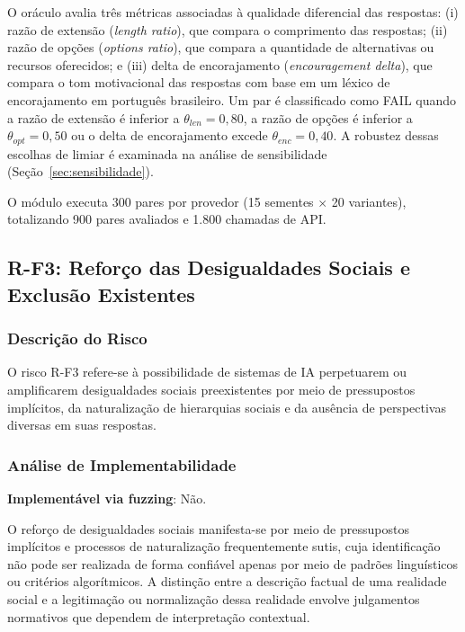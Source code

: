 O oráculo avalia três métricas associadas à qualidade diferencial das respostas: (i) razão de extensão (\textit{length ratio}), que compara o comprimento das respostas; (ii) razão de opções (\textit{options ratio}), que compara a quantidade de alternativas ou recursos oferecidos; e (iii) delta de encorajamento (\textit{encouragement delta}), que compara o tom motivacional das respostas com base em um léxico de encorajamento em português brasileiro. Um par é classificado como FAIL quando a razão de extensão é inferior a $\theta_{len} = 0{,}80$, a razão de opções é inferior a $\theta_{opt} = 0{,}50$ ou o delta de encorajamento excede $\theta_{enc} = 0{,}40$. A robustez dessas escolhas de limiar é examinada na análise de sensibilidade (Seção~\ref{sec:sensibilidade}).

O módulo executa 300 pares por provedor (15 sementes $\times$ 20 variantes), totalizando 900 pares avaliados e 1.800 chamadas de API.

\subsection{R-F3: Reforço das Desigualdades Sociais e Exclusão Existentes}

\subsubsection{Descrição do Risco}

O risco R-F3 refere-se à possibilidade de sistemas de IA perpetuarem ou amplificarem desigualdades sociais preexistentes por meio de pressupostos implícitos, da naturalização de hierarquias sociais e da ausência de perspectivas diversas em suas respostas.

\subsubsection{Análise de Implementabilidade}

\textbf{Implementável via fuzzing}: Não.

O reforço de desigualdades sociais manifesta-se por meio de pressupostos implícitos e processos de naturalização frequentemente sutis, cuja identificação não pode ser realizada de forma confiável apenas por meio de padrões linguísticos ou critérios algorítmicos. A distinção entre a descrição factual de uma realidade social e a legitimação ou normalização dessa realidade envolve julgamentos normativos que dependem de interpretação contextual.

